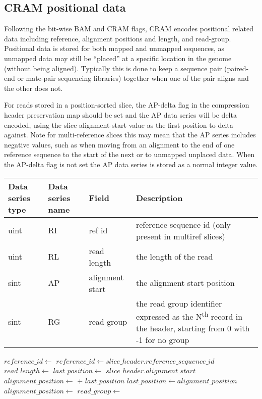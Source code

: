 \documentclass[a4paper]{article}
\begin{document}
\subsection{\textbf{CRAM positional data}}
\label{subsec:positions}

Following the bit-wise BAM and CRAM flags, CRAM encodes positional related data including reference, alignment positions and length, and read-group.
Positional data is stored for both mapped and unmapped sequences, as unmapped data may still be ``placed'' at a specific location in the genome (without being aligned).
Typically this is done to keep a sequence pair (paired-end or mate-pair sequencing libraries) together when one of the pair aligns and the other does not.

For reads stored in a position-sorted slice, the AP-delta flag in the compression header preservation map should be set and the AP data series will be delta encoded, using the slice alignment-start value as the first position to delta against.
Note for multi-reference slices this may mean that the AP series includes negative values, such as when moving from an alignment to the end of one reference sequence to the start of the next or to unmapped unplaced data.  When the AP-delta flag is not set the AP data series is stored as a normal integer value.

\begin{tabular}{|>{\raggedright}p{70pt}|>{\raggedright}p{75pt}|>{\raggedright}p{90pt}|>{\raggedright}p{171pt}|}
\hline
\textbf{Data series type} & \textbf{Data series name} & \textbf{Field} & \textbf{Description}\tabularnewline
\hline
uint & RI & ref id & reference sequence id (only present in multiref slices)\tabularnewline
\hline
uint & RL & read length & the length of the read\tabularnewline
\hline
sint & AP & alignment start & the alignment start position\tabularnewline
\hline
sint & RG & read group & the read group identifier expressed as the N\textsuperscript{th} record in the header, starting from 0 with -1 for no group\tabularnewline
\hline
\end{tabular}

\vskip 20pt
\begin{algorithmic}[1]
  \State $reference\_id\gets$ 
\Else
  \State $reference\_id\gets slice\_header.reference\_sequence\_id$
\EndIf
\State $read\_length \gets$ 
        \State $last\_position\gets$ $slice\_header.alignment\_start$
    \EndIf
    \State $alignment\_position \gets$  + $last\_position$
    \State $last\_position \gets alignment\_position$
\Else
    \State $alignment\_position \gets$ 
\EndIf
\State $read\_group \gets$ 
\EndProcedure
\end{algorithmic}
\end{document}
